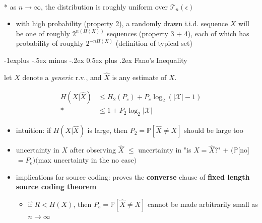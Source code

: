 \documentclass[10pt, landscape]{article}
\makeatletter
\renewcommand{\subsection}{\@startsection{subsection}{2}{0mm}%
  {-1explus -.5ex minus -.2ex}%
  {0.5ex plus .2ex}%
{\normalfont\normalsize\bfseries}}
\makeatother
\begin{document}
\begin{multicols*}{4}
  \begin{tightcenter}
    \\* as $n \to \infty$, the distribution is roughly uniform over $\mathcal{T}_n(\epsilon)$
  \end{tightcenter}

  \begin{itemize}
    \item with high probability (property 2), a randomly drawn i.i.d. sequence $X$ will be one of roughly $2^{n(H(X))}$ sequences (property 3 + 4),
      each of which has probability of roughly $2^{-nH(X)}$ (definition of typical set)
  \end{itemize}


  \subsection{Fano's Inequality}

  let $X$ denote a \textit{generic} r.v., and $\hat{X}$ is any estimate of $X$.

  \begin{tightcenter}
    \begin{align*}
      H(X \vert \hat{X}) &\leq H_2(P_e) + P_e\log_2 (\vert\mathcal{X}\vert -1)  \\*
                         &\leq 1 + P_2 \log_2 \vert \mathcal{X} \vert
    \end{align*}
  \end{tightcenter}

  \begin{itemize}
    \item intuition: if $H(X \vert \hat{X})$ is large, then $P_2 = \mathbb{P}[\hat{X} \neq X]$ should be large too
    \item uncertainty in $X$ after observing $\hat{X}$ $\leq$ uncertainty in "is $X = \hat{X}$?" + $(\mathbb{P}$[no]$=P_e)($max uncertainty in the no case$)$
    \item implications for source coding: proves the \textbf{converse} clause of \textbf{fixed length source coding theorem}
      \begin{itemize}
        \item if $R < H(X)$, then $P_e = \mathbb{P}[\hat{X} \neq X]$ cannot be made arbitrarily small as $n \to \infty$
      \end{itemize}
  \end{itemize}

\end{multicols*}
\end{document}
